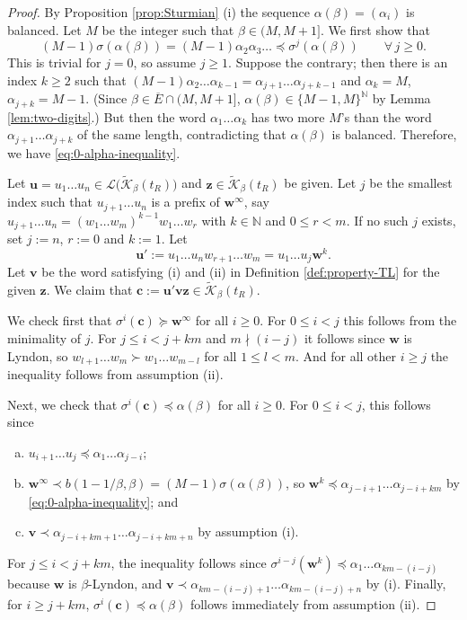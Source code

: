 \documentclass[11pt]{amsart}
\theoremstyle{definition}
\theoremstyle{remark}
\numberwithin{equation}{section}
\newcommand{\N}{\ensuremath{\mathbb{N}}}
\newcommand{\Kt}{\widetilde{\mathcal{K}}}
\renewcommand{\c}{ {\mathbf{c}}}
\newcommand{\cL}{\mathcal{L}}
\renewcommand{\u}{\mathbf{u}}
\renewcommand{\v}{\mathbf{v}}
\newcommand{\w}{\mathbf{w}}
\newcommand{\z}{\mathbf{z}}
\newcommand{\f}{\infty}
\newcommand{\al}{\alpha}
\newcommand{\lle}{\preccurlyeq}
\newcommand{\lge}{\succcurlyeq}
\newcommand{\si}{\sigma}
\begin{document}
\begin{proof}
{By Proposition \ref{prop:Sturmian} (i) the sequence $\al(\beta)=(\al_i)$ is balanced.} 
{Let $M$ be the integer such that $\beta\in(M,M+1]$.}
We first show that
\begin{equation} \label{eq:0-alpha-inequality}
{(M-1)\si(\al(\beta))=(M-1)\al_2\al_3\dots \lle \si^j(\al(\beta)) \qquad \forall\,j\geq 0.}
\end{equation}
This is trivial for $j=0$, so assume $j\geq 1$. Suppose the contrary; then there is an index $k\geq 2$ such that ${(M-1)}\al_2\dots\al_{k-1}=\al_{j+1}\dots\al_{j+k-1}$ and $\al_k={M}$, $\al_{j+k}={M-1}$. {(Since $\beta\in \overline{E}\cap(M,M+1]$, $\al(\beta)\in\{M-1,M\}^\N$ by Lemma \ref{lem:two-digits}.)} But then the word $\al_1\dots\al_k$ has two more {$M$'s} than the word $\al_{j+1}\dots\al_{j+k}$ of the same length, contradicting that $\al(\beta)$ is balanced. Therefore, we have \eqref{eq:0-alpha-inequality}.

Let $\u=u_1\dots u_n\in\cL\big(\Kt_\beta(t_R)\big)$ and $\z\in\Kt_\beta(t_R)$ be given. Let $j$ be the smallest index such that $u_{j+1}\dots u_n$ is a prefix of $\w^\f$, say $u_{j+1}\dots u_n=(w_1\dots w_m)^{k-1}w_1\dots w_r$ with $k\in\N$ and $0\leq r<m$. If no such $j$ exists, set $j:=n$, $r:=0$ and $k:=1$. Let
\[
\u':=u_1\dots u_n w_{r+1}\dots w_m=u_1\dots u_j \w^k.
\]
Let $\v$ be the word satisfying (i) and (ii) in Definition \ref{def:property-TL} for the given $\z$. We claim that $\c:=\u'\v\z\in\Kt_\beta(t_R)$.

We check first that $\si^i(\c)\lge \w^\f$ for all $i\geq 0$. For $0\leq i<j$ this follows from the minimality of $j$. For $j\leq i<j+km$ and $m\nmid(i-j)$ it follows since $\w$ is Lyndon, so $w_{l+1}\dots w_m\succ w_1\dots w_{m-l}$ for all $1\leq l<m$. And for all other $i\geq j$ the inequality follows from assumption (ii).

Next, we check that $\si^i(\c)\lle \al(\beta)$ for all $i\geq 0$. For $0\leq i<j$, this follows since
\begin{enumerate}[(a)]
\item $u_{i+1}\dots u_j\lle\al_1\dots\al_{j-i}$;
\item $\w^\f\prec b(1-1/\beta,\beta)={(M-1)}\si(\al(\beta))$, so $\w^k\lle \al_{j-i+1}\dots\al_{j-i+km}$ by \eqref{eq:0-alpha-inequality}; and
\item $\v\prec\al_{j-i+km+1}\dots\al_{j-i+km+n}$ by {assumption}  (i).
\end{enumerate}
For $j\leq i<j+km$, the inequality follows since $\si^{i-j}(\w^k)\lle \al_1\dots\al_{km-(i-j)}$ because $\w$ is $\beta$-Lyndon, and $\v\prec\al_{km-(i-j)+1}\dots\al_{km-(i-j)+n}$ by (i). Finally, for $i\geq j+km$, $\si^i(\c)\lle \al(\beta)$ follows immediately from {assumption} (ii).
\end{proof}
\end{document}
